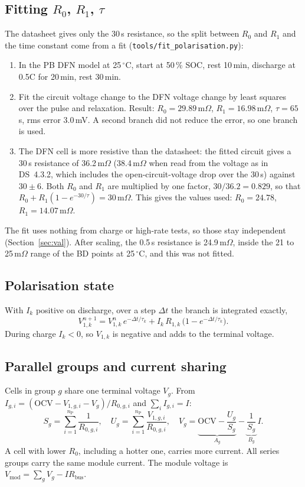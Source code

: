 \documentclass[11pt,a4paper]{article}
\newcommand{\ds}[1]{\textsc{DS}~#1}
\newcommand{\degC}{\ensuremath{{}^{\circ}\mathrm{C}}}
\newcommand{\Rbus}{R_{\mathrm{bus}}}
\newcommand{\nP}{n_{\mathrm{P}}}
\begin{document}
\subsection{Fitting \texorpdfstring{$R_0$, $R_1$, $\tau$}{R0, R1, tau}}
The datasheet gives only the 30\,s resistance, so the split between $R_0$ and $R_1$ and the time constant come from a fit (\texttt{tools/fit\_polarisation.py}):
\begin{enumerate}
\item In the PB DFN model at 25\,\degC, start at 50\,\% SOC, rest 10\,min, discharge at 0.5C for 20\,min, rest 30\,min.
\item Fit the circuit voltage change to the DFN voltage change by least squares over the pulse and relaxation. Result: $R_0=29.89$\,m$\Omega$, $R_1=16.98$\,m$\Omega$, $\tau=65$\,s, rms error 3.0\,mV. A second branch did not reduce the error, so one branch is used.
\item The DFN cell is more resistive than the datasheet: the fitted circuit gives a 30\,s resistance of 36.2\,m$\Omega$ (38.4\,m$\Omega$ when read from the voltage as in \ds{4.3.2}, which includes the open-circuit-voltage drop over the 30\,s) against $30\pm6$. Both $R_0$ and $R_1$ are multiplied by one factor, $30/36.2=0.829$, so that $R_0+R_1(1-e^{-30/\tau})=30$\,m$\Omega$. This gives the values used: $R_0=24.78$, $R_1=14.07$\,m$\Omega$.
\end{enumerate}
The fit uses nothing from charge or high-rate tests, so those stay independent (Section~\ref{sec:val}). After scaling, the 0.5\,s resistance is 24.9\,m$\Omega$, inside the 21 to 25\,m$\Omega$ range of the BD points at 25\,\degC, and this was not fitted.

\subsection{Polarisation state}
With $I_k$ positive on discharge, over a step $\Delta t$ the branch is integrated exactly,
\begin{equation}
V_{1,k}^{n+1}=V_{1,k}^{n}\,e^{-\Delta t/\tau_k}+I_k\,R_{1,k}\,\big(1-e^{-\Delta t/\tau_k}\big).
\end{equation}
During charge $I_k<0$, so $V_{1,k}$ is negative and adds to the terminal voltage.

\subsection{Parallel groups and current sharing}
Cells in group $g$ share one terminal voltage $V_g$. From $I_{g,i}=(\mathrm{OCV}-V_{1,g,i}-V_g)/R_{0,g,i}$ and $\sum_i I_{g,i}=I$:
\begin{equation}
S_g=\sum_{i=1}^{\nP}\frac{1}{R_{0,g,i}},\quad U_g=\sum_{i=1}^{\nP}\frac{V_{1,g,i}}{R_{0,g,i}},\quad
V_g=\underbrace{\mathrm{OCV}-\frac{U_g}{S_g}}_{A_g}-\underbrace{\frac{1}{S_g}}_{B_g}\,I .
\end{equation}
A cell with lower $R_0$, including a hotter one, carries more current. All series groups carry the same module current. The module voltage is $V_{\mathrm{mod}}=\sum_g V_g-I\Rbus$.
\end{document}
